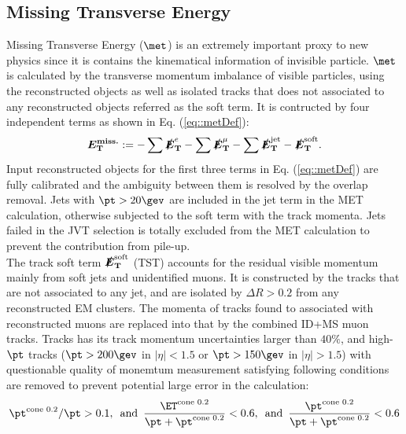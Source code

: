 \subsection{Missing Transverse Energy} \label{sec::objDef::met}
Missing Transverse Energy ($\met$) is an extremely important proxy to new physics since it is contains the kinematical information of invisible particle. $\met$ is calculated by the transverse momentum imbalance of visible particles, using the reconstructed objects as well as isolated tracks that does not associated to any reconstructed objects referred as the soft term.
It is contructed by four independent terms as shown in Eq. (\ref{eq::metDef}):
\begin{align}
\bm{E_\mathrm{T}^{\mathrm{miss.}}} :=  - \sum \bm{\slashed{E}_{\mathrm{T}}}^{e} - \sum \bm{\slashed{E}_{\mathrm{T}}}^{\mu} - \sum \bm{\slashed{E}_{\mathrm{T}}}^{\mathrm{jet}} - \bm{\slashed{E}_{\mathrm{T}}}^{\mathrm{soft}}.
\label{eq::metDef}
\end{align}
Input reconstructed objects for the first three terms in Eq. (\ref{eq::metDef}) are fully calibrated and the ambiguity between them is resolved by the overlap removal. 
Jets with $\pt>20\gev$ are included in the jet term in the MET calculation, otherwise subjected to the soft term with the track momenta.
Jets failed in the JVT selection is totally excluded from the MET calculation to prevent the contribution from pile-up. \\

The track soft term $\bm{\slashed{E}_{\mathrm{T}}}^{\mathrm{soft}}$ (TST) \cite{175_MET_Run2_exp} accounts for the residual visible momentum mainly from soft jets and unidentified muons.
It is constructed by the tracks that are not associated to any jet, and are isolated by $\Delta R>0.2$ from any reconstructed EM clusters. The momenta of tracks found to associated with reconstructed muons are replaced into that by the combined ID+MS muon tracks. 
Tracks has its track momentum uncertainties larger than $40\%$, and high-$\pt$ tracks ($\pt>200 \gev$ in $|\eta|<1.5$ or $\pt>150 \gev$ in $|\eta|>1.5$) with questionable quality of monemtum measurement satisfying following conditions are removed to prevent potential large error in the calculation:
\begin{align}
\ptcone/\pt>0.1, \,\,\, \mathrm{and} \,\,\, \frac{\etcone}{\pt+\ptcone}<0.6, \,\,\,  \mathrm{and} \,\,\, \frac{\ptcone}{\pt+\ptcone}<0.6
\end{align}


